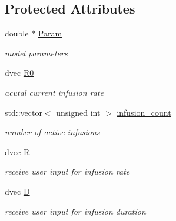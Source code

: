 \subsection*{Protected Attributes}
\begin{DoxyCompactItemize}
\item 
\mbox{\label{classodeproblem_a8d6506f6a9e0676911ee86659db725ae}} 
double $\ast$ \hyperlink{classodeproblem_a8d6506f6a9e0676911ee86659db725ae}{Param}
\begin{DoxyCompactList}\small\item\em model parameters \end{DoxyCompactList}\item 
\mbox{\label{classodeproblem_ae467cabc47b5d75c07cb2d48915d4507}} 
dvec \hyperlink{classodeproblem_ae467cabc47b5d75c07cb2d48915d4507}{R0}
\begin{DoxyCompactList}\small\item\em acutal current infusion rate \end{DoxyCompactList}\item 
\mbox{\label{classodeproblem_a51662bd0cd437b3481f83b662172d505}} 
std\+::vector$<$ unsigned int $>$ \hyperlink{classodeproblem_a51662bd0cd437b3481f83b662172d505}{infusion\+\_\+count}
\begin{DoxyCompactList}\small\item\em number of active infusions \end{DoxyCompactList}\item 
\mbox{\label{classodeproblem_af0b19177db1bdd5a610b34c298b8a7e5}} 
dvec \hyperlink{classodeproblem_af0b19177db1bdd5a610b34c298b8a7e5}{R}
\begin{DoxyCompactList}\small\item\em receive user input for infusion rate \end{DoxyCompactList}\item 
\mbox{\label{classodeproblem_af46382c0b9a5a489f726d0fb360d9e40}} 
dvec \hyperlink{classodeproblem_af46382c0b9a5a489f726d0fb360d9e40}{D}
\begin{DoxyCompactList}\small\item\em receive user input for infusion duration \end{DoxyCompactList}\item 

\end{DoxyCompactItemize}
